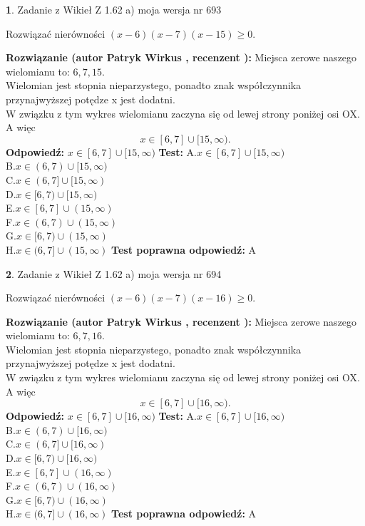 \documentclass[12pt, a4paper]{article}
\theoremstyle{definition} %
\newtheorem{zad}{}
\newcommand{\zadStart}[1]{\begin{zad}#1\newline}
\newcommand{\zadStop}{\end{zad}}
\newcommand{\rozwStart}[2]{\noindent \textbf{Rozwiązanie (autor #1 , recenzent #2): }\newline}
\newcommand{\rozwStop}{\newline}
\newcommand{\odpStart}{\noindent \textbf{Odpowiedź:}\newline}
\newcommand{\odpStop}{\newline}
\newcommand{\testStart}{\noindent \textbf{Test:}\newline}
\newcommand{\testStop}{\newline}
\newcommand{\kluczStart}{\noindent \textbf{Test poprawna odpowiedź:}\newline}
\newcommand{\kluczStop}{\newline}
\begin{document}
\zadStart{Zadanie z Wikieł Z 1.62 a) moja wersja nr 693}

Rozwiązać nierówności $(x-6)(x-7)(x-15)\ge0$.
\zadStop
\rozwStart{Patryk Wirkus}{}
Miejsca zerowe naszego wielomianu to: $6, 7, 15$.\\
Wielomian jest stopnia nieparzystego, ponadto znak współczynnika przy\linebreak najwyższej potędze x jest dodatni.\\ W związku z tym wykres wielomianu zaczyna się od lewej strony poniżej osi OX. A więc $$x \in [6,7] \cup [15,\infty).$$
\rozwStop
\odpStart
$x \in [6,7] \cup [15,\infty)$
\odpStop
\testStart
A.$x \in [6,7] \cup [15,\infty)$\\
B.$x \in (6,7) \cup [15,\infty)$\\
C.$x \in (6,7] \cup [15,\infty)$\\
D.$x \in [6,7) \cup [15,\infty)$\\
E.$x \in [6,7] \cup (15,\infty)$\\
F.$x \in (6,7) \cup (15,\infty)$\\
G.$x \in [6,7) \cup (15,\infty)$\\
H.$x \in (6,7] \cup (15,\infty)$
\testStop
\kluczStart
A
\kluczStop



\zadStart{Zadanie z Wikieł Z 1.62 a) moja wersja nr 694}

Rozwiązać nierówności $(x-6)(x-7)(x-16)\ge0$.
\zadStop
\rozwStart{Patryk Wirkus}{}
Miejsca zerowe naszego wielomianu to: $6, 7, 16$.\\
Wielomian jest stopnia nieparzystego, ponadto znak współczynnika przy\linebreak najwyższej potędze x jest dodatni.\\ W związku z tym wykres wielomianu zaczyna się od lewej strony poniżej osi OX. A więc $$x \in [6,7] \cup [16,\infty).$$
\rozwStop
\odpStart
$x \in [6,7] \cup [16,\infty)$
\odpStop
\testStart
A.$x \in [6,7] \cup [16,\infty)$\\
B.$x \in (6,7) \cup [16,\infty)$\\
C.$x \in (6,7] \cup [16,\infty)$\\
D.$x \in [6,7) \cup [16,\infty)$\\
E.$x \in [6,7] \cup (16,\infty)$\\
F.$x \in (6,7) \cup (16,\infty)$\\
G.$x \in [6,7) \cup (16,\infty)$\\
H.$x \in (6,7] \cup (16,\infty)$
\testStop
\kluczStart
A
\kluczStop
\end{document}
